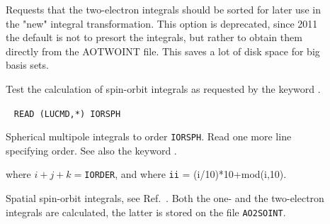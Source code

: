 \begin{description}
\item[]\label{key:SORT_I} Requests that the
two-electron integrals should be sorted for later use in the "new"
integral transformation. This option is deprecated, since
2011 the default is not to presort the integrals, but rather to
obtain them directly from the AOTWOINT file. This saves a lot of disk
space for big basis sets.

\item[] Test the calculation of spin-orbit integrals as
requested by the keyword .

\item[]\verb| |\newline
\verb|READ (LUCMD,*) IORSPH|

Spherical multipole integrals to order
\verb|IORSPH|. Read one more
line specifying order. See also the keyword .

where $i+j+k =$\verb|IORDER|, and where \verb|ii| = (i/10)*10+mod(i,10).

\item[] Spatial spin-orbit
integrals, see Ref.~\cite{ovhapjhjajthjojcp96}. Both the one- and the
two-electron integrals are calculated, the latter is stored on the file
\verb|AO2SOINT|.


%


\end{description}
